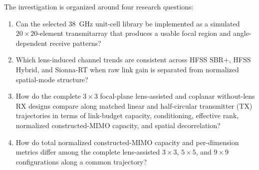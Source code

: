 The investigation is organized around four research questions:
\begin{enumerate}
    \item Can the selected 38~GHz unit-cell library be implemented as a simulated $20\times20$-element transmitarray that produces a usable focal region and angle-dependent receive patterns?
    \item Which lens-induced channel trends are consistent across HFSS SBR+, HFSS Hybrid, and Sionna-RT when raw link gain is separated from normalized spatial-mode structure?
    \item How do the complete $3\times3$ focal-plane lens-assisted and coplanar without-lens RX designs compare along matched linear and half-circular transmitter (TX) trajectories in terms of link-budget capacity, conditioning, effective rank, normalized constructed-MIMO capacity, and spatial decorrelation?
    \item How do total normalized constructed-MIMO capacity and per-dimension metrics differ among the complete lens-assisted $3\times3$, $5\times5$, and $9\times9$ configurations along a common trajectory?
\end{enumerate}



